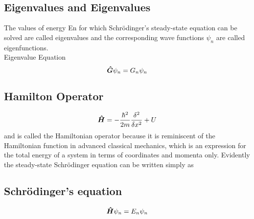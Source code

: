 \documentclass{article}
\begin{document}
\subsection*{Eigenvalues and Eigenvalues}
The values of energy En for which Schrödinger's steady-state equation can be solved are called eigenvalues and the corresponding wave functions $\psi_n$ are called eigenfunctions. \vspace{20pt}
\\
Eigenvalue Equation
\begin{equation}
    \vu*{G}\psi_n=G_n\psi_n
\end{equation}

\subsection*{Hamilton Operator}
\begin{equation}
    \vu*{H}=-\frac{\hbar^2}{2m}\frac{\delta^2}{\delta x^2}+U
\end{equation}
and is called the Hamiltonian operator because it is reminiscent of the Hamiltonian
function in advanced classical mechanics, which is an expression for the total energy
of a system in terms of coordinates and momenta only. Evidently the steady-state
Schrödinger equation can be written simply as
\subsection*{Schrödinger's equation}
\begin{equation}
    \vu*{H}\psi_n=E_n\psi_n
\end{equation}

\break
\end{document}

